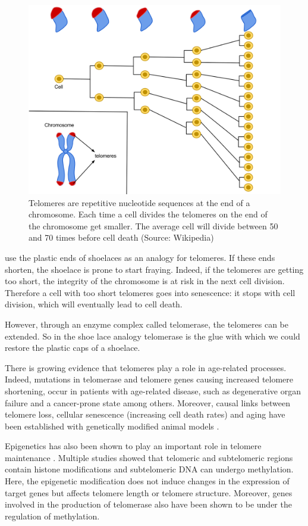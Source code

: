 \documentclass[
  11pt,
]{book}
\begin{document}
\begin{figure}

{\centering \includegraphics[width=0.8\linewidth]{./figs/telomeres} 

}

\caption{Telomeres are repetitive nucleotide sequences at the end of a chromosome. Each time a cell divides the telomeres on the end of the chromosome get smaller. The average cell will divide between 50 and 70 times before cell death (Source: Wikipedia)}\label{fig:telomeres}
\end{figure}

\citet{BlackburnEpel2017} use the plastic ends of shoelaces as an analogy for telomeres. If these ends shorten, the shoelace is prone to start fraying. Indeed, if the telomeres are getting too short, the integrity of the chromosome is at risk in the next cell division. Therefore a cell with too short telomeres goes into senescence: it stops with cell division, which will eventually lead to cell death.

However, through an enzyme complex called telomerase, the telomeres can be extended. So in the shoe lace analogy telomerase is the glue with which we could restore the plastic caps of a shoelace.

There is growing evidence that telomeres play a role in age-related processes. Indeed, mutations in telomerase and telomere genes causing increased telomere shortening, occur in patients with age-related disease, such as degenerative organ failure and a cancer-prone state among others. Moreover, causal links between telomere loss, cellular senescence (increasing cell death rates) and aging have been established with genetically modified animal models \citep{Adwan2018}.

Epigenetics has also been shown to play an important role in telomere maintenance \citep{Adwan2018}.
Multiple studies showed that telomeric and subtelomeric regions contain histone modifications and subtelomeric DNA can undergo methylation.
Here, the epigenetic modification does not induce changes in the expression of target genes but affects telomere length or telomere structure.
Moreover, genes involved in the production of telomerase also have been shown to be under the regulation of methylation.
\end{document}
